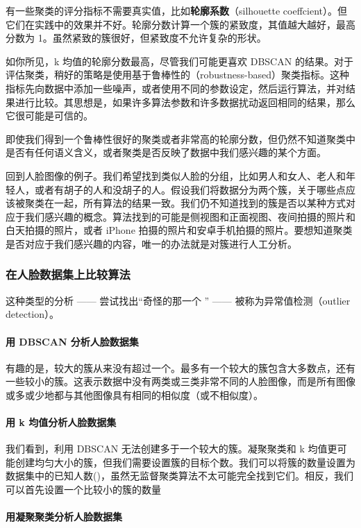有一些聚类的评分指标不需要真实值，比如\textbf{轮廓系数}（silhouette coeffcient）。但它们在实践中的效果并不好。轮廓分数计算一个簇的紧致度，其值越大越好，最高分数为 1。虽然紧致的簇很好，但紧致度不允许复杂的形状。

如你所见，k 均值的轮廓分数最高，尽管我们可能更喜欢 DBSCAN 的结果。对于评估聚类，稍好的策略是使用基于鲁棒性的（robustness-based）聚类指标。这种指标先向数据中添加一些噪声，或者使用不同的参数设定，然后运行算法，并对结果进行比较。其思想是，如果许多算法参数和许多数据扰动返回相同的结果，那么它很可能是可信的。

即使我们得到一个鲁棒性很好的聚类或者非常高的轮廓分数，但仍然不知道聚类中是否有任何语义含义，或者聚类是否反映了数据中我们感兴趣的某个方面。

回到人脸图像的例子。我们希望找到类似人脸的分组，比如男人和女人、老人和年轻人，或者有胡子的人和没胡子的人。假设我们将数据分为两个簇，关于哪些点应该被聚类在一起，所有算法的结果一致。我们仍不知道找到的簇是否以某种方式对应于我们感兴趣的概念。算法找到的可能是侧视图和正面视图、夜间拍摄的照片和白天拍摄的照片，或者 iPhone 拍摄的照片和安卓手机拍摄的照片。要想知道聚类是否对应于我们感兴趣的内容，唯一的办法就是对簇进行人工分析。

\subsubsection{在人脸数据集上比较算法}
这种类型的分析 —— 尝试找出“奇怪的那一个 ” —— 被称为异常值检测（outlier detection）。

\paragraph{用 DBSCAN 分析人脸数据集} 有趣的是，较大的簇从来没有超过一个。最多有一个较大的簇包含大多数点，还有一些较小的簇。这表示数据中没有两类或三类非常不同的人脸图像，而是所有图像或多或少地都与其他图像具有相同的相似度（或不相似度）。

\paragraph{用 k 均值分析人脸数据集} 我们看到，利用 DBSCAN 无法创建多于一个较大的簇。凝聚聚类和 k 均值更可能创建均匀大小的簇，但我们需要设置簇的目标个数。我们可以将簇的数量设置为数据集中的已知人数()，虽然无监督聚类算法不太可能完全找到它们。相反，我们可以首先设置一个比较小的簇的数量

\paragraph{用凝聚聚类分析人脸数据集}
